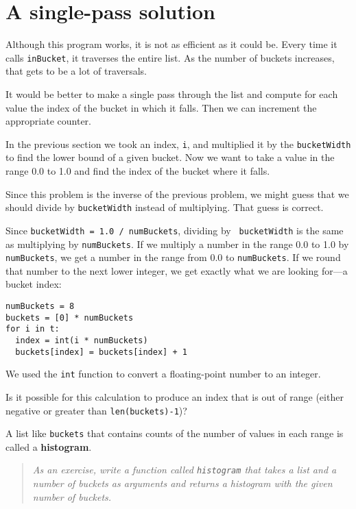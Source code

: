 \section{A single-pass solution}

Although this program works, it is not as efficient as it could be.
Every time it calls {\tt inBucket}, it traverses the entire list.  As
the number of buckets increases, that gets to be a lot of traversals.

It would be better to make a single pass through the list and compute
for each value the index of the bucket in which it falls.  Then we can
increment the appropriate counter.

In the previous section we took an index, {\tt i}, and multiplied it
by the {\tt bucketWidth} to find the lower bound of a given
bucket.  Now we want to take a value in the range 0.0 to 1.0 and find the
index of the bucket where it falls.

Since this problem is the inverse of the previous problem, we might
guess that we should divide by {\tt bucketWidth} instead of
multiplying.  That guess is correct.

Since {\tt bucketWidth = 1.0 / numBuckets}, dividing by {\tt
bucketWidth} is the same as multiplying by {\tt numBuckets}.  If we
multiply a number in the range 0.0 to 1.0 by {\tt numBuckets}, we get
a number in the range from 0.0 to {\tt numBuckets}.  If we round that
number to the next lower integer, we get exactly what we are looking
for---a bucket index:

\beforeverb
\begin{verbatim}
numBuckets = 8
buckets = [0] * numBuckets
for i in t:
  index = int(i * numBuckets)
  buckets[index] = buckets[index] + 1
\end{verbatim}
\afterverb
%
We used the {\tt int} function to convert a floating-point
number to an integer.

Is it possible for this calculation to produce an index that is out of
range (either negative or greater than {\tt len(buckets)-1})?

A list like {\tt buckets} that contains counts of the number of values
in each range is called a {\bf histogram}.

\begin{quote}
{\em As an exercise, write a function called {\tt histogram} that
takes a list and a number of buckets as arguments and returns
a histogram with the given number of buckets.}
\end{quote}

